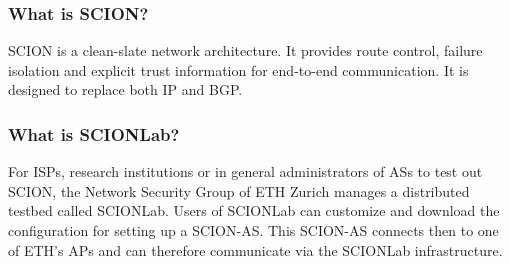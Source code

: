\subsubsection{What is SCION?}

\acs{SCION} is a clean-slate network architecture. It provides route control, failure isolation and explicit trust information for end-to-end communication\cite{scion2019website}. It is designed to replace both \acs{IP} and \acs{BGP}. 

\subsubsection{What is SCIONLab?}

For \acp{ISP}, research institutions or in general administrators of \acp{AS} to test out \acs{SCION}, the Network Security Group of \acs{ETH} Zurich manages a distributed testbed called \acs{SCIONLab}. Users of \acs{SCIONLab} can customize and download the configuration for setting up a \acs{SCION}-\ac{AS}. This \acs{SCION}-\ac{AS} connects then to one of \acs{ETH}'s \aclp{AP} and can therefore communicate  via the \acs{SCIONLab} infrastructure.
